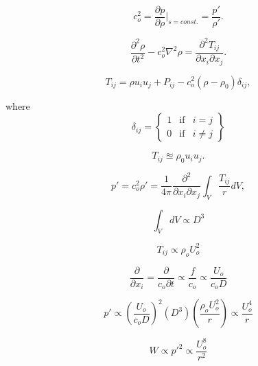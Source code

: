 \begin{equation}
	c_o^2 = \frac{\partial p}{\partial \rho}|_{s=const.} = \frac{p'}{\rho'}.
\end{equation}

\begin{equation}
\frac{\partial^2 \rho}{\partial t^2} - c_o^2 \nabla^2 \rho = \frac{\partial^2 T_{ij}}{\partial x_i \partial x_j}.
\end{equation}

\begin{equation}
T_{ij} = \rho u_i u_j + P_{ij} - c_o^2(\rho - \rho_0) \delta_{ij},
\end{equation}

where
\begin{equation}
\delta_{ij} = \left\{
\begin{array}{lcr}
1 & \mbox{if} & i = j \\
0 & \mbox{if} & i \neq j
\end{array}
\right\}
\end{equation}

\begin{equation}
T_{ij} \approxeq \rho_0 u_i u_j.
\end{equation}

\begin{equation}
p' = c_o^2 \rho' = \frac{1}{4\pi} \frac{\partial^2}{\partial x_i \partial x_j} \int_{V} \frac{T_{ij}}{r}dV,
\end{equation}

\begin{equation}
\int_{V} dV \propto D^3
\end{equation}

\begin{equation}
T_{ij} \propto \rho_o U_o^2
\end{equation}

\begin{equation}
\frac{\partial}{\partial x_i} = \frac{\partial}{c_o \partial t} \propto \frac{f}{c_o} \propto \frac{U_o}{c_o D}
\end{equation}

\begin{equation}
p' \propto \left( \frac{U_o}{c_o D} \right)^2 \left( D^3 \right) \left( \frac{\rho_o U_o^2}{r} \right) \propto \frac{U_o^4}{r}
\end{equation}

\begin{equation}
W \propto p'^2 \propto \frac{U_o^8}{r^2}
\end{equation}

